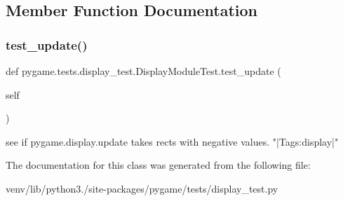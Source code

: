 \subsection{Member Function Documentation}
\mbox{\label{classpygame_1_1tests_1_1display__test_1_1_display_module_test_abaaba357fe0822f6010a6b1b8ad6cccf}} 
\subsubsection{\texorpdfstring{test\+\_\+update()}{test\_update()}}
{\footnotesize\ttfamily def pygame.\+tests.\+display\+\_\+test.\+Display\+Module\+Test.\+test\+\_\+update (\begin{DoxyParamCaption}\item[{}]{self }\end{DoxyParamCaption})}

\begin{DoxyVerb}see if pygame.display.update takes rects with negative values.
    "|Tags:display|"
\end{DoxyVerb}
 

The documentation for this class was generated from the following file\+:\begin{DoxyCompactItemize}
\item 
venv/lib/python3./site-\/packages/pygame/tests/display\+\_\+test.\+py\end{DoxyCompactItemize}
